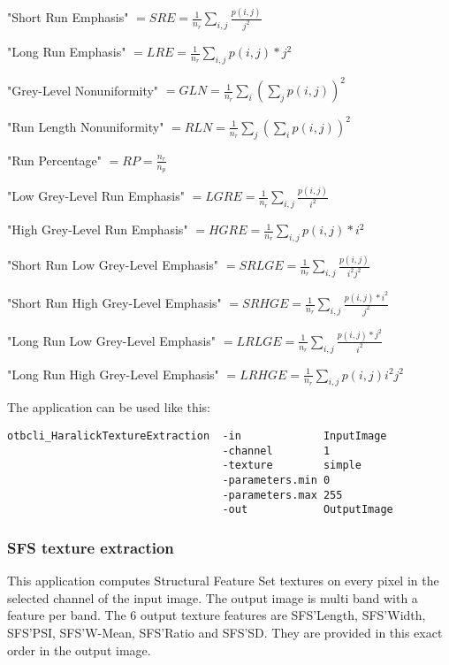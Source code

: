 \begin{itemize}
"Short Run Emphasis" $ = SRE = \frac{1}{n_r} \sum_{i, j}\frac{p(i, j)}{j^2} $

"Long Run Emphasis" $ = LRE = \frac{1}{n_r} \sum_{i, j}p(i, j) * j^2 $

"Grey-Level Nonuniformity" $ = GLN = \frac{1}{n_r} \sum_{i} \left( \sum_{j}{p(i, j)} \right)^2 $

"Run Length Nonuniformity" $ = RLN = \frac{1}{n_r} \sum_{j} \left( \sum_{i}{p(i, j)} \right)^2 $

"Run Percentage" $ = RP = \frac{n_r}{n_p} $

"Low Grey-Level Run Emphasis" $ = LGRE = \frac{1}{n_r} \sum_{i, j}\frac{p(i, j)}{i^2} $

"High Grey-Level Run Emphasis" $ = HGRE = \frac{1}{n_r} \sum_{i, j}p(i, j) * i^2 $

"Short Run Low Grey-Level Emphasis" $ = SRLGE = \frac{1}{n_r} \sum_{i, j}\frac{p(i, j)}{i^2 j^2} $

"Short Run High Grey-Level Emphasis" $ = SRHGE = \frac{1}{n_r} \sum_{i, j}\frac{p(i, j) * i^2}{j^2} $

"Long Run Low Grey-Level Emphasis" $ = LRLGE = \frac{1}{n_r} \sum_{i, j}\frac{p(i, j) * j^2}{i^2} $

"Long Run High Grey-Level Emphasis" $ = LRHGE = \frac{1}{n_r} \sum_{i, j} p(i, j) i^2 j^2 $

\end{itemize}




The application can be used like this:
\begin{verbatim}
otbcli_HaralickTextureExtraction  -in             InputImage
                                  -channel        1
                                  -texture        simple
                                  -parameters.min 0
                                  -parameters.max 255
                                  -out            OutputImage
\end{verbatim}





\subsubsection{SFS texture extraction}

This application computes Structural Feature Set textures on every pixel in the
selected channel of the input image. The output image is multi band with a feature
per band. The 6 output texture features are SFS'Length, SFS'Width, SFS'PSI,
SFS'W-Mean, SFS'Ratio and SFS'SD. They are provided in this exact order in the
output image.

